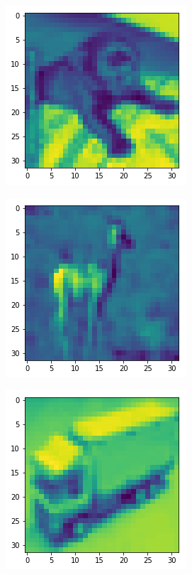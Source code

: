 \begin{figure}[H]
\begin{subfigure}{.3\linewidth}
\end{subfigure}
\begin{subfigure}{.3\linewidth}
    \centering
    \includegraphics[scale=0.4]{chapter_3_figures/cifar_chimp.png}
\end{subfigure}
    \hfill
\begin{subfigure}{.3\linewidth}
    \centering
    \includegraphics[scale=0.4]{chapter_3_figures/cifar_gazelle.png}
\end{subfigure}
   \hfill
\begin{subfigure}{.3\linewidth}
    \centering
    \includegraphics[scale=0.4]{chapter_3_figures/cifar_lorry.png}
\end{subfigure}


\end{figure}
